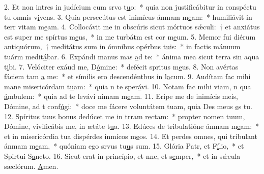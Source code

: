 2. Et non intres in judícium cum srvo t\uline{u}o:~* quia non justificábitur in conspéctu tu omnis v\uline{i}vens.
3. Quia persecútus est inimícus ánmam m\uline{e}am:~* humiliávit in terr vitam m\uline{e}am.
4. Collocávit me in obscúris sicut mórtuos sǽculi:~† et anxiátus est super me spírtus m\uline{e}us,~* in me turbátm est cor m\uline{e}um.
5. Memor fui diérum antiquórum,~† meditátus sum in ómnibus opérbus t\uline{u}is:~* in factis mánuum tuárm medit\uline{á}bar.
6. Expándi manus mas \uline{a}d te:~* ánima mea sicut terra sin aqua t\uline{i}bi.
7. Velóciter exáud me, D\uline{ó}mine:~* defécit spritus m\uline{e}us.
8. Non avértas fáciem tam \uline{a} me:~* et símilis ero descendéntbus in l\uline{a}cum.
9. Audítam fac mihi mane misericórdam t\uline{u}am:~* quia n te sper\uline{á}vi.
10. Notam fac mihi viam, n qua \uline{á}mbulem:~* quia ad te levávi nimam m\uline{e}am.
11. Eripe me de inimícis meis, Dómine, ad t conf\uline{ú}gi:~* doce me fácere voluntátem tuam, quia Des meus \uline{e}s tu.
12. Spíritus tuus bonus dedúcet me in trram r\uline{e}ctam:~* propter nomen tuum, Dómine, vivificábis me, in ætáte t\uline{u}a.
13. Edúces de tribulatióne ánmam m\uline{e}am:~* et in misericórdia tua dispérdes inmícos m\uline{e}os.
14. Et perdes omnes, qui tríbulant ánmam m\uline{e}am,~* quóniam ego srvus tu\uline{u}s sum.
15. Glória Patr, et F\uline{í}lio,~* et Spirtui S\uline{a}ncto.
16. Sicut erat in princípio, et nnc, et s\uline{e}mper,~* et in sǽcula sæclórum. \uline{A}men.
